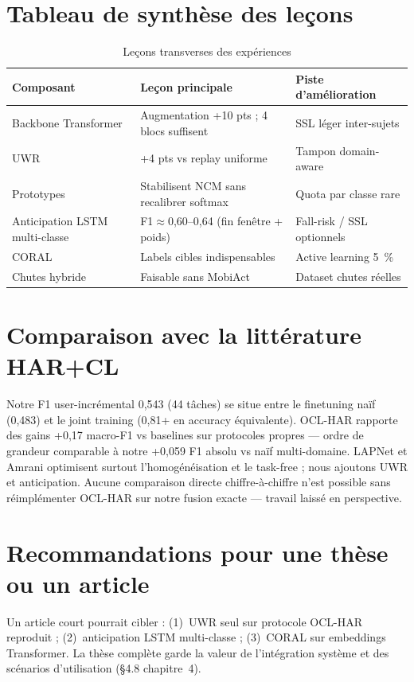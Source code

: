 \documentclass[a4paper,12pt]{report}
\begin{document}
\section{Tableau de synthèse des leçons}

\begin{table}[H]
\centering
\small
\begin{tabularx}{\textwidth}{|Y|Y|Y|}
\hline
\textbf{Composant} & \textbf{Leçon principale} & \textbf{Piste d'amélioration} \\
\hline
Backbone Transformer & Augmentation +10 pts ; 4 blocs suffisent & SSL léger inter-sujets \\
UWR & +4 pts vs replay uniforme & Tampon domain-aware \\
Prototypes & Stabilisent NCM sans recalibrer softmax & Quota par classe rare \\
Anticipation LSTM multi-classe & F1$\approx$0,60--0,64 (fin fenêtre + poids) & Fall-risk / SSL optionnels \\
CORAL & Labels cibles indispensables & Active learning 5~\% \\
Chutes hybride & Faisable sans MobiAct & Dataset chutes réelles \\
\hline
\end{tabularx}
\caption{Leçons transverses des expériences}
\label{tab:app_lecons}
\end{table}

\section{Comparaison avec la littérature HAR+CL}

Notre F1 user-incrémental 0,543 (44 tâches) se situe entre le finetuning naïf
(0,483) et le joint training (0,81+ en accuracy équivalente). OCL-HAR rapporte
des gains +0,17 macro-F1 vs baselines sur protocoles propres — ordre de grandeur
comparable à notre +0,059 F1 absolu vs naïf multi-domaine. LAPNet et Amrani
optimisent surtout l'homogénéisation et le task-free ; nous ajoutons UWR et
anticipation. Aucune comparaison directe chiffre-à-chiffre n'est possible sans
réimplémenter OCL-HAR sur notre fusion exacte — travail laissé en perspective.

\section{Recommandations pour une thèse ou un article}

Un article court pourrait cibler : (1)~UWR seul sur protocole OCL-HAR reproduit ;
(2)~anticipation LSTM multi-classe ; (3)~CORAL sur
embeddings Transformer. La thèse complète garde la valeur de l'intégration
système et des scénarios d'utilisation (§4.8 chapitre~4).
\end{document}

